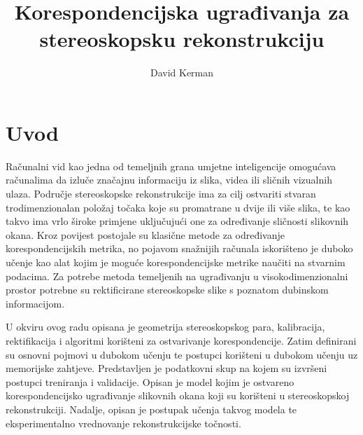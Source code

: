 \documentclass[times, utf8, zavrsni, numeric]{fer}
\begin{document}

\title{Korespondencijska ugrađivanja za stereoskopsku rekonstrukciju}

\author{David Kerman}

\maketitle




\tableofcontents

\chapter{Uvod}
Računalni vid kao jedna od temeljnih grana umjetne inteligencije omogućava računalima da izluče značajnu informaciju iz slika, videa ili sličnih vizualnih ulaza. Područje stereoskopske rekonstrukcije ima za cilj ostvariti stvaran trodimenzionalan položaj točaka koje su promatrane u dvije ili više slika, te kao takvo ima vrlo široke primjene uključujući one za određivanje sličnosti slikovnih okana. Kroz povijest postojale su klasične metode za određivanje korespondencijskih metrika, no pojavom snažnijih računala iskorišteno je duboko učenje kao alat kojim je moguće korespondencijske metrike naučiti na stvarnim podacima. Za potrebe metoda temeljenih na ugrađivanju u visokodimenzionalni prostor potrebne su rektificirane stereoskopske slike s poznatom dubinskom informacijom.

U okviru ovog radu opisana je geometrija stereoskopskog para, kalibracija, rektifikacija i algoritmi korišteni za ostvarivanje korespondencije. Zatim definirani su osnovni pojmovi u dubokom učenju te postupci korišteni u dubokom učenju uz memorijske zahtjeve. Predstavljen je podatkovni skup na kojem su izvršeni postupci treniranja i validacije. Opisan je model kojim je ostvareno korespondencijsko ugrađivanje slikovnih okana koji su korišteni u stereoskopskoj rekonstrukciji. Nadalje, opisan je postupak učenja takvog modela te eksperimentalno vrednovanje rekonstrukcijske točnosti.
\end{document}
